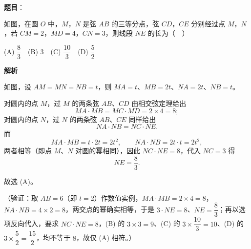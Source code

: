\begin{answer}

\textbf{题目}：

如图，在圆 \(O\) 中，\(M\)，\(N\) 是弦 \(AB\) 的三等分点，弦 \(CD\)，\(CE\) 分别经过点 \(M\)，\(N\)，若 \(CM=2\)，\(MD=4\)，\(CN=3\)，则线段 \(NE\) 的长为（　）
\nopagebreak[4]
\begin{center}\end{center}
\nopagebreak[4]
(A) \(\dfrac{8}{3}\)　(B) 3　(C) \(\dfrac{10}{3}\)　(D) \(\dfrac{5}{2}\)

\textbf{解析}

如图，设 \(AM=MN=NB=t\)，则 \(MA=t\)、\(MB=2t\)、\(NA=2t\)、\(NB=t\)。

对圆内的点 \(M\)，过 \(M\) 的两条弦 \(AB\)、\(CD\) 由相交弦定理给出
\nopagebreak[4]
\[
MA\cdot MB=MC\cdot MD=2\times 4=8;
\]
对圆内的点 \(N\)，过 \(N\) 的两条弦 \(AB\)、\(CE\) 同样给出
\nopagebreak[4]
\[
NA\cdot NB=NC\cdot NE.
\]
而
\nopagebreak[4]
\[
MA\cdot MB=t\cdot 2t=2t^2,\qquad NA\cdot NB=2t\cdot t=2t^2,
\]
两者相等（即点 \(M\)、\(N\) 对圆的幂相同），因此 \(NC\cdot NE=8\)，代入 \(NC=3\) 得
\nopagebreak[4]
\[
NE=\dfrac{8}{3}.
\]

故选 (A)。

（验证：取 \(AB=6\)（即 \(t=2\)）作数值实例，\(MA\cdot MB=2\times 4=8\)，\(NA\cdot NB=4\times 2=8\)，两交点的幂确实相等，于是 \(3\cdot NE=8\)、\(NE=\dfrac{8}{3}\)；再以选项反向代入，要求 \(NC\cdot NE=8\)，(B) 的 \(3\times 3=9\)、(C) 的 \(3\times\dfrac{10}{3}=10\)、(D) 的 \(3\times\dfrac{5}{2}=\dfrac{15}{2}\)，均不等于 \(8\)，故仅 (A) 相符。）


\end{answer}
